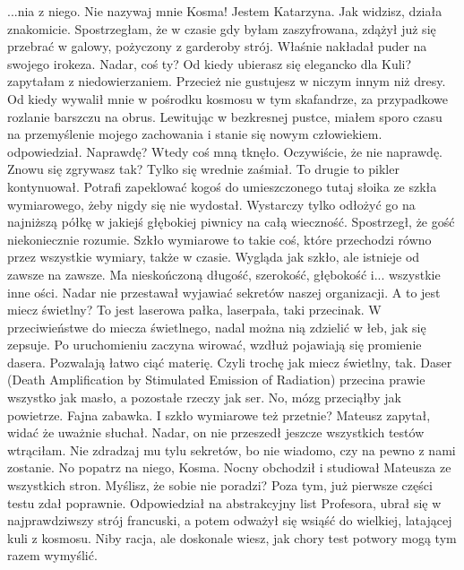\begin{dialogue}
...nia z niego. \dm{} Nie nazywaj mnie Kosma! Jestem Katarzyna.
\ds{} Jak widzisz, działa znakomicie. \dm{} Spostrzegłam, że w czasie gdy byłam zaszyfrowana, zdążył już się przebrać w galowy, pożyczony z garderoby strój. 
Właśnie nakładał puder na swojego irokeza.
\ds{} Nadar, coś ty? Od kiedy ubierasz się elegancko dla Kuli? \dm{} zapytałam z niedowierzaniem. \dm{} Przecież nie gustujesz w niczym innym niż dresy.
\ds{} Od kiedy wywalił mnie w pośrodku kosmosu w tym skafandrze, za przypadkowe rozlanie barszczu na obrus. 
Lewitując w bezkresnej pustce, miałem sporo czasu na przemyślenie mojego zachowania i stanie się nowym człowiekiem. \dm{} odpowiedział.
\ds{} Naprawdę? \dm{} Wtedy coś mną tknęło. \dm{} Oczywiście, że nie naprawdę. Znowu się zgrywasz tak? \dm{} Tylko się wrednie zaśmiał.
\ds{} To drugie to pikler \dm{} kontynuował. \dm{} 
Potrafi zapeklować kogoś do umieszczonego tutaj słoika ze szkła wymiarowego, żeby nigdy się nie wydostał.
Wystarczy tylko odłożyć go na najniższą półkę w jakiejś głębokiej piwnicy na całą wieczność.
\dm{} Spostrzegł, że gość niekoniecznie rozumie. \dm{}
Szkło wymiarowe to takie coś, które przechodzi równo przez wszystkie wymiary, także w czasie. 
Wygląda jak szkło, ale istnieje od zawsze na zawsze. 
Ma nieskończoną długość, szerokość, głębokość i... wszystkie inne ości. \dm{}
Nadar nie przestawał wyjawiać sekretów naszej organizacji.
\ds{} A to jest miecz świetlny?
\ds{} To jest laserowa pałka, laserpała, taki przecinak. W przeciwieństwe do miecza świetlnego, nadal można nią zdzielić w łeb, jak się zepsuje.
Po uruchomieniu zaczyna wirować, wzdłuż pojawiają się promienie dasera. Pozwalają łatwo ciąć materię. Czyli trochę jak miecz świetlny, tak.
Daser (Death Amplification by Stimulated Emission of Radiation) przecina prawie wszystko jak masło, a pozostałe rzeczy jak ser. 
No, mózg przeciąłby jak powietrze.
Fajna zabawka.
\ds{} I szkło wymiarowe też przetnie? \ds{} Mateusz zapytał, widać że uważnie słuchał.
\ds{} Nadar, on nie przeszedł jeszcze wszystkich testów \dm{} wtrąciłam. \dm{} Nie zdradzaj mu tylu sekretów, bo nie wiadomo, czy na pewno z nami zostanie.
\ds{} No popatrz na niego, Kosma. \dm{} Nocny obchodził i studiował Mateusza ze wszystkich stron. \dm{} Myślisz, że sobie nie poradzi?
Poza tym, już pierwsze części testu zdał poprawnie. 
Odpowiedział na abstrakcyjny list Profesora, ubrał się w najprawdziwszy strój francuski, a potem odważył się wsiąść do wielkiej, latającej kuli z kosmosu.
\ds{} Niby racja, ale doskonale wiesz, jak chory test potwory mogą tym razem wymyślić.

\end{dialogue}
